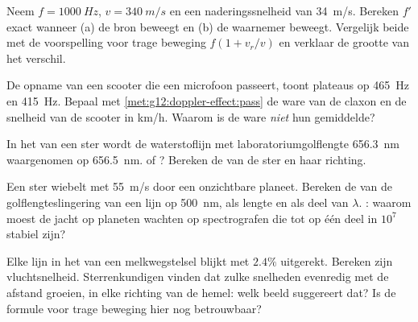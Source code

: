 \begin{exercise}[$\star\star$]\label{exo:g12:doppler-effect:9}
Neem $f = \qty{1000}{Hz}$, $v = \qty{340}{m/s}$ en een naderingssnelheid
van \qty{34}{m/s}. Bereken $f'$ exact wanneer (a) de bron beweegt en
(b) de waarnemer beweegt. Vergelijk beide met de voorspelling voor trage
beweging $f(1 + v_r/v)$ en verklaar de grootte van het verschil.
\end{exercise}

\begin{exercise}[$\star\star$]\label{exo:g12:doppler-effect:10}
De opname van een scooter die een microfoon passeert, toont plateaus op
\qty{465}{Hz} en \qty{415}{Hz}. Bepaal met
\cref{met:g12:doppler-effect:pass} de ware  van de claxon en de
snelheid van de scooter in \unit{km/h}. Waarom is de ware 
\emph{niet} hun gemiddelde?
\end{exercise}

\begin{exercise}[$\star\star$]\label{exo:g12:doppler-effect:11}
In het  van een ster wordt de waterstoflijn met
laboratoriumgolflengte \qty{656.3}{nm} waargenomen op \qty{656.5}{nm}.
 of ? Bereken de  van de
ster en haar richting.
\end{exercise}

\begin{exercise}[$\star\star\star$]\label{exo:g12:doppler-effect:12}
Een ster wiebelt met \qty{55}{m/s} door een onzichtbare planeet. Bereken
de  van de golflengteslingering van een lijn op \qty{500}{nm},
als lengte en als deel van $\lambda$. : waarom moest de jacht
op planeten wachten op spectrografen die tot op één deel in $10^{7}$
stabiel zijn?
\end{exercise}

\begin{exercise}[$\star\star\star$]\label{exo:g12:doppler-effect:13}
Elke lijn in het  van een melkwegstelsel blijkt met $2.4\%$
uitgerekt. Bereken zijn vluchtsnelheid. Sterrenkundigen vinden dat zulke
snelheden evenredig met de afstand groeien, in elke richting van de hemel:
welk beeld suggereert dat? Is de formule voor trage beweging hier nog
betrouwbaar?
\end{exercise}

